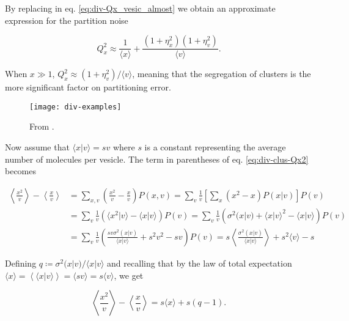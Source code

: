 By replacing in eq. \eqref{eq:div-Qx_vesic_almost} we obtain an approximate expression for the partition noise

\begin{equation*}
  Q_x^2 \approx \frac{1}{\langle x\rangle} + \frac{(1+\eta_x^2)(1+\eta_v^2)}{\langle v\rangle}.
\end{equation*}

When $x\gg 1$, $Q_x^2\approx(1+\eta_v^2)/\langle v\rangle$, meaning that the segregation of clusters is the more significant factor on partitioning error.


\begin{figure}[H]
  \centering
  \texttt{[image: div-examples]}
  \caption[FILL]{\label{fig:div-examples2} From \cite{pedraza08}.}
\end{figure}

Now assume that $\langle x|v\rangle = sv$ where $s$ is a constant representing the average number of molecules per vesicle. The term in parentheses of eq. \eqref{eq:div-clus-Qx2} becomes

\begin{equation*}
  \begin{split}
    \left\langle \frac{x^2}{v}\right\rangle-\left\langle \frac{x}{v}\right\rangle &= \sum_{x,v}\left( \frac{x^2}{v}- \frac{x}{v}\right)P(x,v) = \sum_v\frac{1}{v}\left[\sum_x\left(x^2- x\right)P(x|v)\right]P(v)\\
    &=\sum_v\frac{1}{v}\left(\langle x^2|v\rangle - \langle x|v\rangle\right)P(v)=\sum_v\frac{1}{v}\left(\sigma^2(x|v) + \langle x|v\rangle^2-\langle x|v\rangle\right)P(v)\\
    &=\sum_v\frac{1}{v}\left(\frac{sv\sigma^2(x|v)}{\langle x|v\rangle} + s^2v^2-sv\right)P(v) = s\left\langle\frac{\sigma^2(x|v)}{\langle x|v\rangle}\right\rangle + s^2\langle v\rangle - s
  \end{split}
\end{equation*}

Defining $q\coloneqq\sigma^2(x|v)/\langle x|v\rangle$ and recalling that by the law of total expectation $\langle x\rangle = \left\langle\langle x|v\rangle\right\rangle = \langle sv\rangle =s\langle v\rangle$, we get

\begin{equation*}
  \left\langle \frac{x^2}{v}\right\rangle-\left\langle \frac{x}{v}\right\rangle = s\langle x\rangle+s(q-1).
\end{equation*}

